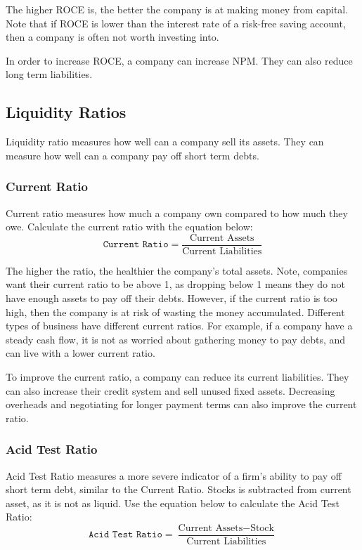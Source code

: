 \documentclass{standalone}
\begin{document}
The higher ROCE is, the better the company is at making money from capital.
Note that if ROCE is lower than the interest rate of a risk-free saving account, then a company is often not worth investing into.

In order to increase ROCE, a company can increase NPM.
They can also reduce long term liabilities.

\subsection{Liquidity Ratios}
Liquidity ratio measures how well can a company sell its assets.
They can measure how well can a company pay off short term debts.

\subsubsection{Current Ratio}
Current ratio measures how much a company own compared to how much they owe.
Calculate the current ratio with the equation below:
\begin{equation}
    \texttt{Current Ratio} = \frac{\textrm{Current Assets}}{\textrm{Current Liabilities}}
\end{equation}

The higher the ratio, the healthier the company's total assets.
Note, companies want their current ratio to be above 1, as dropping below 1 means they do not have enough assets to pay off their debts.
However, if the current ratio is too high, then the company is at risk of wasting the money accumulated.
Different types of business have different current ratios.
For example, if a company have a steady cash flow, it is not as worried about gathering money to pay debts, and can live with a lower current ratio.

To improve the current ratio, a company can reduce its current liabilities.
They can also increase their credit system and sell unused fixed assets.
Decreasing overheads and negotiating for longer payment terms can also improve the current ratio.

\subsubsection{Acid Test Ratio}
Acid Test Ratio measures a more severe indicator of a firm's ability to pay off short term debt, similar to the Current Ratio.
Stocks is subtracted from current asset, as it is not as liquid.
Use the equation below to calculate the Acid Test Ratio:
\begin{equation}
    \texttt{Acid Test Ratio} = \frac{\textrm{Current Assets} - \textrm{Stock}}{\textrm{Current Liabilities}}
\end{equation}
\end{document}
